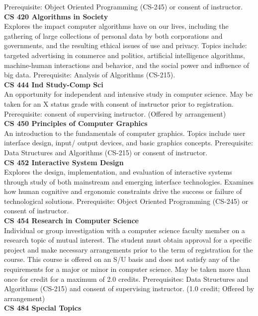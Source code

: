 \documentclass[
  letterpaper,
]{scrbook}
\begin{document}
Prerequisite: Object Oriented Programming (CS-245) or consent of
instructor.\\
\textbf{CS 420 Algorithms in Society}\\
Explores the impact computer algorithms have on our lives, including the
gathering of large collections of personal data by both corporations and
governments, and the resulting ethical issues of use and privacy. Topics
include: targeted advertising in commerce and politics, artificial
intelligence algorithms, machine-human interactions and behavior, and
the social power and influence of big data. Prerequisite: Analysis of
Algorithms (CS-215).\\
\textbf{CS 444 Ind Study-Comp Sci}\\
An opportunity for independent and intensive study in computer science.
May be taken for an X status grade with consent of instructor prior to
registration. Prerequisite: consent of supervising instructor. (Offered
by arrangement)\\
\textbf{CS 450 Principles of Computer Graphics}\\
An introduction to the fundamentals of computer graphics. Topics include
user interface design, input/ output devices, and basic graphics
concepts. Prerequisite: Data Structures and Algorithms (CS-215) or
consent of instructor.\\
\textbf{CS 452 Interactive System Design}\\
Explores the design, implementation, and evaluation of interactive
systems through study of both mainstream and emerging interface
technologies. Examines how human cognitive and ergonomic constraints
drive the success or failure of technological solutions. Prerequisite:
Object Oriented Programming (CS-245) or consent of instructor.\\
\textbf{CS 454 Research in Computer Science}\\
Individual or group investigation with a computer science faculty member
on a research topic of mutual interest. The student must obtain approval
for a specific project and make necessary arrangements prior to the term
of registration for the course. This course is offered on an S/U basis
and does not satisfy any of the requirements for a major or minor in
computer science. May be taken more than once for credit for a maximum
of 2.0 credits. Prerequisites: Data Structures and Algorithms (CS-215)
and consent of supervising instructor. (1.0 credit; Offered by
arrangement)\\
\textbf{CS 484 Special Topics}\\
\end{document}
